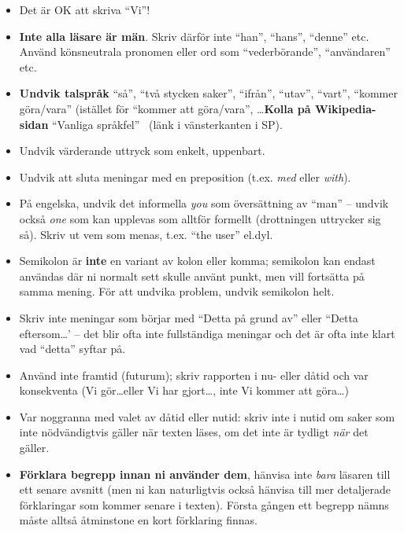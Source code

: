 \documentclass[a4paper,12pt]{article}
\begin{document}
\begin{itemize}
\item    Det är OK att skriva ``Vi''!

\item    \textbf{Inte alla läsare är män}.  Skriv därför inte ``han'', ``hans'', ``denne'' etc.  Använd könsneutrala pronomen eller ord som ``vederbörande'', ``användaren'' etc.

\item    \textbf{Undvik talspråk} ``så'', ``två stycken saker'', ``ifrån'', ``utav'', ``vart'', ``kommer göra/vara'' (istället för ``kommer att göra/vara'', \ldots \textbf{Kolla på Wikipedia-sidan} ``Vanliga språkfel''~\cite{wp:sprakfel} (länk i vänsterkanten i SP).

\item    Undvik värderande uttryck som enkelt, uppenbart.

\item Undvik att sluta meningar med en preposition (t.ex. \emph{med} eller \emph{with}).

\item På engelska, undvik det informella \emph{you} som översättning av ``man'' -- undvik också \emph{one} som kan upplevas som alltför formellt (drottningen uttrycker sig så). Skriv ut vem som menas, t.ex. ``the user'' el.dyl.

\item    Semikolon är \textbf{inte} en variant av kolon eller komma; semikolon kan endast användas där ni normalt sett skulle använt punkt, men vill fortsätta på samma mening. För att undvika problem, undvik semikolon helt.

\item    Skriv inte meningar som börjar med ``Detta på grund av'' eller ``Detta eftersom\ldots' -- det blir ofta inte fullständiga meningar och det är ofta inte klart vad ``detta'' syftar på.

\item    Använd inte framtid (futurum); skriv rapporten i nu- eller dåtid och var konsekventa (Vi gör\ldots eller Vi har gjort\ldots, inte Vi kommer att göra\ldots)

\item Var noggranna med valet av dåtid eller nutid: skriv inte i nutid om saker som inte nödvändigtvis gäller när texten läses, om det inte är tydligt \emph{när} det gäller.

\item    \textbf{Förklara begrepp innan ni använder dem}, hänvisa inte \emph{bara} läsaren till ett senare avsnitt (men ni kan naturligtvis också hänvisa till mer detaljerade förklaringar som kommer senare i texten).  Första gången ett begrepp nämns måste alltså åtminstone en kort förklaring finnas.


\end{itemize}
\end{document}

